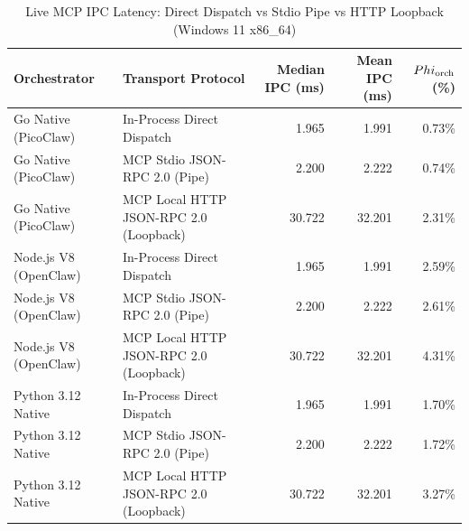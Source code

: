 \begin{table}[t]
\centering\small
\caption{Live MCP IPC Latency: Direct Dispatch vs Stdio Pipe vs HTTP Loopback (Windows 11 x86_64)}
\label{tab:Windows_mcp_transport}
\begin{tabular}{llrrr}
\toprule
Orchestrator & Transport Protocol & Median IPC (ms) & Mean IPC (ms) & $\\Phi_{\text{orch}}$ (\%) \\
\midrule
Go Native (PicoClaw) & In-Process Direct Dispatch & 1.965 & 1.991 & 0.73\% \\
Go Native (PicoClaw) & MCP Stdio JSON-RPC 2.0 (Pipe) & 2.200 & 2.222 & 0.74\% \\
Go Native (PicoClaw) & MCP Local HTTP JSON-RPC 2.0 (Loopback) & 30.722 & 32.201 & 2.31\% \\
Node.js V8 (OpenClaw) & In-Process Direct Dispatch & 1.965 & 1.991 & 2.59\% \\
Node.js V8 (OpenClaw) & MCP Stdio JSON-RPC 2.0 (Pipe) & 2.200 & 2.222 & 2.61\% \\
Node.js V8 (OpenClaw) & MCP Local HTTP JSON-RPC 2.0 (Loopback) & 30.722 & 32.201 & 4.31\% \\
Python 3.12 Native & In-Process Direct Dispatch & 1.965 & 1.991 & 1.70\% \\
Python 3.12 Native & MCP Stdio JSON-RPC 2.0 (Pipe) & 2.200 & 2.222 & 1.72\% \\
Python 3.12 Native & MCP Local HTTP JSON-RPC 2.0 (Loopback) & 30.722 & 32.201 & 3.27\% \\
\bottomrule
\end{tabular}
\end{table}
